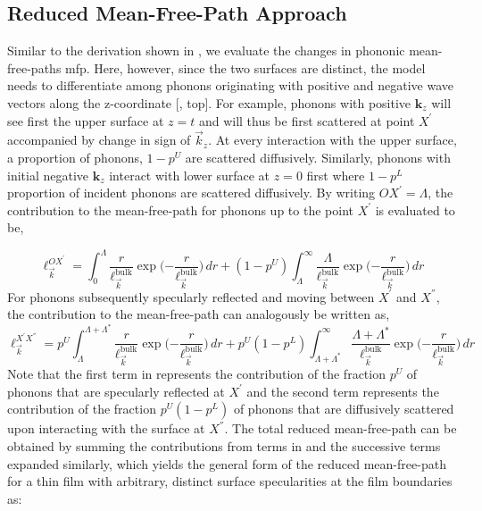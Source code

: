 \subsection{Reduced Mean-Free-Path Approach}
Similar to the derivation shown in , we evaluate the changes in phononic mean-free-paths \gls{mfp}. Here, however, since the two surfaces are distinct, the model needs to differentiate among phonons originating with positive and negative wave vectors along the z-coordinate [, top]. For example, phonons with positive $\mathbf{k}_{z}$ will see first the upper surface at $z = t$ and will thus be first scattered at point $X^{'}$ accompanied by change in sign of $\vec{k}_{z}$. At every interaction with the upper surface, a proportion of phonons, $1-p^{U}$ are scattered diffusively. Similarly, phonons with initial negative $\mathbf{k}_{z}$ interact with lower surface at $z=0$ first where $1-p^{L}$ proportion of incident phonons are scattered diffusively. By writing $OX^{'}=\Lambda$, the contribution to the mean-free-path for phonons up to the point $X^{'}$ is evaluated to be,

\begin{equation}
\ell_{\vec{k}}^{{OX^{'}}}=\int_{0}^{\Lambda}{\frac{r}{\ell_{\vec{k}}^{\textrm{bulk}}}\exp\Big({-\frac{r}{\ell_{\vec{k}}^{\textrm{bulk}}}} \Big)\,dr} + (1-p^{U})\int_{\Lambda}^{\infty} {\frac{\Lambda}{\ell_{\vec{k}}^{\textrm{bulk}}}\exp\Big({-\frac{r}{\ell_{\vec{k}}^{\textrm{bulk}}}}\Big)\,dr}
\label{eq:ox}
\end{equation} 
For phonons subsequently specularly reflected and moving between $X^{'}$ and $X^{''}$, the contribution to the mean-free-path can analogously be written as,
\begin{equation}
\ell_{\vec{k}}^{{X^{'}X^{''}}}=p^{U}\int_{\Lambda}^{\Lambda+\Lambda^{*}}{\frac{r}{\ell_{\vec{k}}^{\textrm{bulk}}}\exp\Big({-\frac{r}{\ell_{\vec{k}}^{\textrm{bulk}}}} \Big)\,dr} + p^{U}(1-p^{L})\int_{\Lambda+\Lambda^{*}}^{\infty} {\frac{\Lambda+\Lambda^{*}}{\ell_{\vec{k}}^{\textrm{bulk}}}\exp\Big({-\frac{r}{\ell_{\vec{k}}^{\textrm{bulk}}}}\Big)\,dr}
\label{eq:xx}
\end{equation} 
Note that the first term in  represents the contribution of the fraction $p^{U}$ of phonons that are specularly reflected at $X^{'}$ and the second term represents the contribution of the fraction $p^{U} (1-p^{L})$ of phonons that are diffusively scattered upon interacting with the surface at $X^{''}$. The total reduced mean-free-path can be obtained by summing the contributions from terms in  and the successive terms expanded similarly, which yields the general form of the reduced mean-free-path for a thin film with arbitrary, distinct surface specularities at the film boundaries as:


